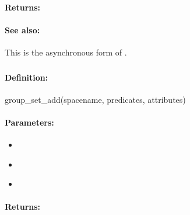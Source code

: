 \paragraph{Returns:}


\paragraph{See also:}  This is the asynchronous form of .

\pagebreak
\subsubsection{}
\label{api:ruby:group_set_add}


\paragraph{Definition:}
\begin{rubycode}
group_set_add(spacename, predicates, attributes)
\end{rubycode}

\paragraph{Parameters:}
\begin{itemize}[noitemsep]
\item {}\\

\item {}\\

\item {}\\

\end{itemize}

\paragraph{Returns:}


\pagebreak
\subsubsection{}
\label{api:ruby:async_group_set_add}


